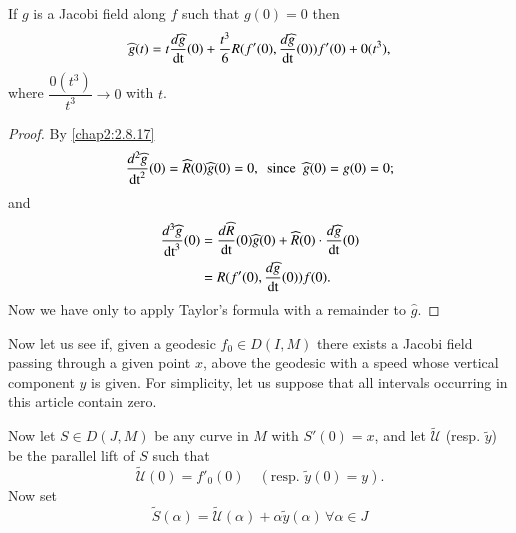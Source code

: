 \setcounter{subsection}{17}

\subsection{}\label{chap2:2.8.18}

\begin{remark*}
If \pageoriginale $g$ is a Jacobi field along $f$ such that $g(0)=0$
then
$$
\widehat{g}(t)=t\dfrac{d\widehat{g}}{\operatorname{dt}}(0)+\frac{t^{3}}{6}R(f'(0),\frac{d\widehat{g}}{\operatorname{dt}}(0))f'(0)+0(t^{3}), 
$$
where $\dfrac{0(t^{3})}{t^{3}}\to 0$ with $t$.
\end{remark*}

\begin{proof}
By \eqref{chap2:2.8.17}
$$
\frac{d^{2}\widehat{g}}{\operatorname{dt}^{2}}(0)=\widehat{R}(0)\widehat{g}(0)=0,\text{
  \ since \ }\widehat{g}(0)=g(0)=0;
$$
and
\begin{align*}
\frac{d^{3}\widehat{g}}{\operatorname{dt}^{3}}(0) &=
\frac{d\widehat{R}}{\operatorname{dt}}(0)\widehat{g}(0)+\widehat{R}(0)\cdot
\frac{d\widehat{g}}{\operatorname{dt}}(0)\\
&= R(f'(0),\frac{d\widehat{g}}{\operatorname{dt}}(0))f(0).
\end{align*}
Now we have only to apply Taylor's formula with a remainder to $\widehat{g}$.
\end{proof}

Now let us see if, given a geodesic $f_{0}\in D(I,M)$ there exists a
Jacobi field passing through a given point $x$, above the geodesic
with a speed whose vertical component $y$ is given. For simplicity,
let us suppose that all intervals occurring in this article contain
zero.

Now let $S\in D(J,M)$ be any curve in $M$ with $S'(0)=x$, and let
$\widetilde{\mathscr{U}}$ (resp. $\widetilde{y}$) be the parallel lift
of $S$ such that 
$$
\widetilde{\mathscr{U}}(0)=f'_{0}(0)\quad (\text{resp. } \widetilde{y}(0)=y).
$$
Now set
\begin{equation*}
\widetilde{S}(\alpha)=\widetilde{\mathscr{U}}(\alpha)+\alpha\widetilde{y}(\alpha)
\, \forall 
    \alpha \in J\tag{2.8.19}\label{chap2:2.8.19}
\end{equation*}

\setcounter{subsection}{19}

\subsection{}\label{chap2:2.8.20}

